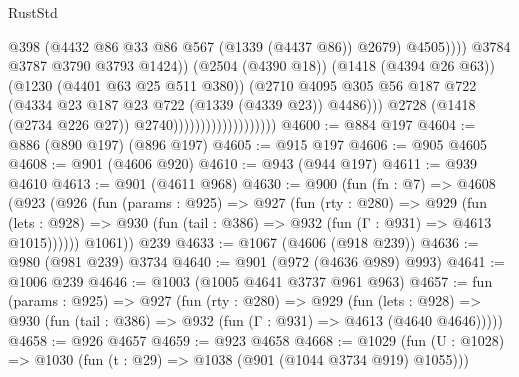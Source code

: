 \begin{lexlean}{RustStd}
\begin{coremodule}
{\begin{coremodule}
{{{{{{{{{{{{{{                                                        @398
                                                        (@4432
                                                          @86
                                                          @33
                                                          @86
                                                          @567
                                                          (@1339 (@4437 @86))
                                                          @2679)
                                                        @4505))))
                                                @3784
                                                @3787
                                                @3790
                                                @3793
                                                @1424))
                                            (@2504 (@4390 @18))
                                            (@1418 (@4394 @26 @63))
                                            (@1230 (@4401 @63 @25 @511 @380))
                                            (@2710
                                              @4095
                                              @305
                                              @56
                                              @187
                                              @722
                                              (@4334 @23 @187 @23 @722 (@1339 (@4339 @23)) @4486)))
                                          @2728
                                          (@1418 (@2734 @226 @27))
                                          @2740)))))))))))))))))))
@4600 := @884 @197
@4604 := @886 (@890 @197) (@896 @197)
@4605 := @915 @197
@4606 := @905 @4605
@4608 := @901 (@4606 @920)
@4610 := @943 (@944 @197)
@4611 := @939 @4610
@4613 := @901 (@4611 @968)
@4630 := @900
    (fun (fn : @7) =>
    @4608
      (@923
        (@926
          (fun (params : @925) =>
          @927
            (fun (rty : @280) =>
            @929
              (fun (lets : @928) =>
              @930 (fun (tail : @386) => @932 (fun (Γ : @931) => @4613 @1015))))))
        @1061))
    @239
@4633 := @1067 (@4606 (@918 @239))
@4636 := @980 (@981 @239) @3734
@4640 := @901 (@972 (@4636 @989) @993)
@4641 := @1006 @239
@4646 := @1003 (@1005 @4641 @3737 @961 @963)
@4657 := fun (params : @925) =>
  @927
    (fun (rty : @280) =>
    @929
      (fun (lets : @928) =>
      @930 (fun (tail : @386) => @932 (fun (Γ : @931) => @4613 (@4640 @4646)))))
@4658 := @926 @4657
@4659 := @923 @4658
@4668 := @1029 (fun (U : @1028) => @1030 (fun (t : @29) => @1038 (@901 (@1044 @3734 @919) @1055)))
}}}}}}}}}}}}}}
\end{coremodule}}
\end{coremodule}
\end{lexlean}
